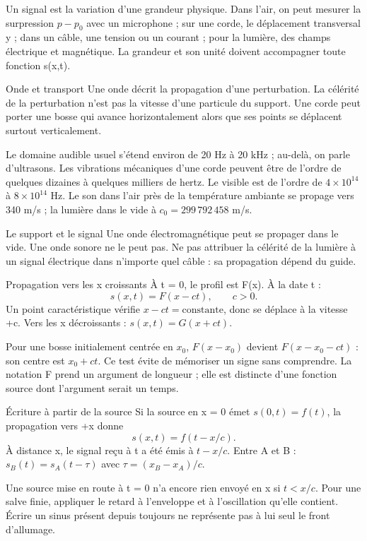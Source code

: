 Un signal est la variation d’une grandeur physique. Dans l’air, on peut mesurer la surpression $p-p_0$ avec un microphone ; sur une corde, le déplacement transversal y ; dans un câble, une tension ou un courant ; pour la lumière, des champs électrique et magnétique. La grandeur et son unité doivent accompagner toute fonction s(x,t).
\begin{loi}{Onde et transport}
Une onde décrit la propagation d’une perturbation. La célérité de la perturbation n’est pas la vitesse d’une particule du support. Une corde peut porter une bosse qui avance horizontalement alors que ses points se déplacent surtout verticalement.
\end{loi}
Le domaine audible usuel s’étend environ de 20 Hz à 20 kHz ; au-delà, on parle d’ultrasons. Les vibrations mécaniques d’une corde peuvent être de l’ordre de quelques dizaines à quelques milliers de hertz. Le visible est de l’ordre de $4\times10^{14}$ à $8\times10^{14}$ Hz. Le son dans l’air près de la température ambiante se propage vers 340 m/s ; la lumière dans le vide à $c_0=299\,792\,458$ m/s.
\begin{piege}{Le support et le signal}
Une onde électromagnétique peut se propager dans le vide. Une onde sonore ne le peut pas. Ne pas attribuer la célérité de la lumière à un signal électrique dans n’importe quel câble : sa propagation dépend du guide.
\end{piege}


\begin{loi}{Propagation vers les x croissants}
À t = 0, le profil est F(x). À la date t :\[s(x,t)=F(x-ct),\qquad c>0.\]Un point caractéristique vérifie $x-ct=\text{constante}$, donc se déplace à la vitesse +c. Vers les x décroissants : $s(x,t)=G(x+ct)$.
\end{loi}
Pour une bosse initialement centrée en $x_0$, $F(x-x_0)$ devient $F(x-x_0-ct)$ : son centre est $x_0+ct$. Ce test évite de mémoriser un signe sans comprendre. La notation F prend un argument de longueur ; elle est distincte d’une fonction source dont l’argument serait un temps.


\begin{loi}{Écriture à partir de la source}
Si la source en x = 0 émet $s(0,t)=f(t)$, la propagation vers +x donne\[s(x,t)=f(t-x/c).\]À distance x, le signal reçu à t a été émis à $t-x/c$. Entre A et B : $s_B(t)=s_A(t-\tau)$ avec $\tau=(x_B-x_A)/c$.
\end{loi}
Une source mise en route à t = 0 n’a encore rien envoyé en x si $t<x/c$. Pour une salve finie, appliquer le retard à l’enveloppe et à l’oscillation qu’elle contient. Écrire un sinus présent depuis toujours ne représente pas à lui seul le front d’allumage.


